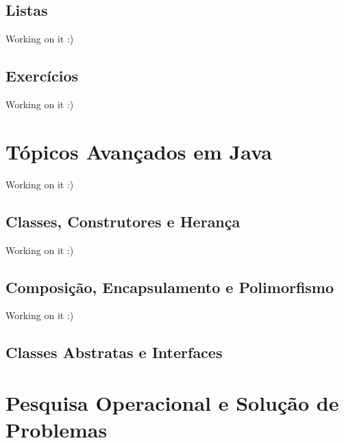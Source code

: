 \documentclass[
]{book}
\begin{document}
\hypertarget{listas}{%
\section{Listas}\label{listas}}

Working on it :)

\hypertarget{exercuxedcios-1}{%
\section*{Exercícios}\label{exercuxedcios-1}}

Working on it :)

\hypertarget{tuxf3picos-avanuxe7ados-em-java}{%
\chapter{Tópicos Avançados em Java}\label{tuxf3picos-avanuxe7ados-em-java}}

Working on it :)

\hypertarget{classes-construtores-e-heranuxe7a}{%
\section{Classes, Construtores e Herança}\label{classes-construtores-e-heranuxe7a}}

Working on it :)

\hypertarget{composiuxe7uxe3o-encapsulamento-e-polimorfismo}{%
\section{Composição, Encapsulamento e Polimorfismo}\label{composiuxe7uxe3o-encapsulamento-e-polimorfismo}}

Working on it :)

\hypertarget{classes-abstratas-e-interfaces}{%
\section{Classes Abstratas e Interfaces}\label{classes-abstratas-e-interfaces}}

\hypertarget{pesquisa-operacional-e-soluuxe7uxe3o-de-problemas}{%
\chapter{Pesquisa Operacional e Solução de Problemas}\label{pesquisa-operacional-e-soluuxe7uxe3o-de-problemas}}
\end{document}
